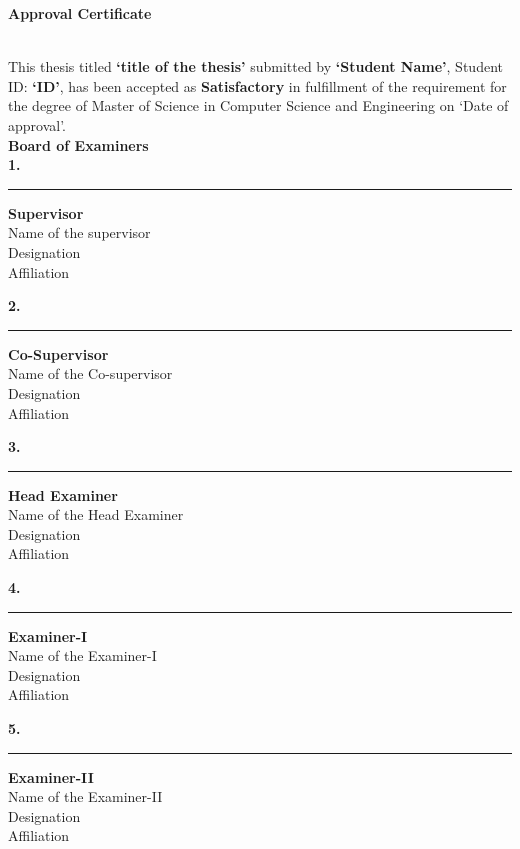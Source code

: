 \begin{flushleft}


{\LARGE\textbf{Approval Certificate}}

\\
This thesis titled \textbf{`title of the thesis'} submitted by \textbf{`Student Name'}, Student ID: \textbf{`ID'}, has been accepted as \textbf{Satisfactory} in fulfillment of the requirement for the degree of Master of Science in Computer Science and Engineering on `Date of approval'.\\[1.5em]

\textbf{Board of Examiners}\\[1em]

\textbf{1.}\\
\rule{8cm}{0.4pt} \hfill \textbf{Supervisor}\\
Name of the supervisor\\
Designation\\
Affiliation \\
\vspace{0.2cm}


\textbf{2.}\\
\rule{8cm}{0.4pt} \hfill \textbf{Co-Supervisor}\\
Name of the Co-supervisor\\
Designation\\
Affiliation \\
\vspace{0.2cm}

\textbf{3.}\\
\rule{8cm}{0.4pt} \hfill \textbf{Head Examiner}\\
Name of the Head Examiner\\
Designation\\
Affiliation \\
\vspace{0.2cm}

\textbf{4.}\\
\rule{8cm}{0.4pt} \hfill \textbf{Examiner-I}\\
Name of the Examiner-I\\
Designation\\
Affiliation \\
\vspace{0.2cm}

\textbf{5.}\\
\rule{8cm}{0.4pt} \hfill \textbf{Examiner-II}\\
Name of the Examiner-II\\
Designation\\
Affiliation \\
\vspace{0.2cm}


\end{flushleft}
